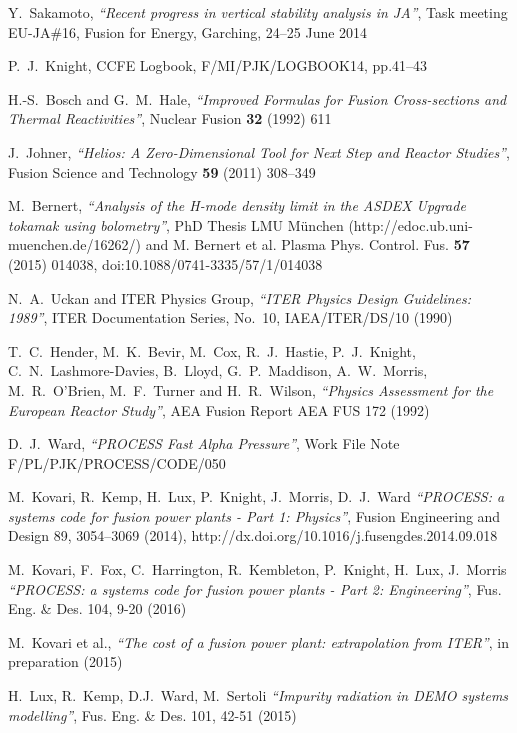 \documentclass[11pt,a4paper]{report}
\begin{document}
\begin{thebibliography}{99}
Y.\ Sakamoto,
\textit{``Recent progress in vertical stability analysis in JA''},
Task meeting EU-JA\#16, Fusion for Energy, Garching, 24--25 June 2014

P.\ J.\ Knight, CCFE Logbook, F/MI/PJK/LOGBOOK14, pp.41--43

H.-S.\ Bosch and G.\ M.\ Hale,
\textit{``Improved Formulas for Fusion Cross-sections and Thermal Reactivities''},
Nuclear Fusion \textbf{32} (1992) 611

J.\ Johner,
\textit{``Helios: A Zero-Dimensional Tool for Next Step and Reactor Studies''},
Fusion Science and Technology \textbf{59} (2011) 308--349

M.\ Bernert,
\textit{``Analysis of the H-mode density limit in the ASDEX Upgrade tokamak using bolometry''},
PhD Thesis LMU München (http://edoc.ub.uni-muenchen.de/16262/) and M. Bernert et al. Plasma Phys. Control. Fus. \textbf{57} (2015) 014038, doi:10.1088/0741-3335/57/1/014038

N.\ A.\ Uckan and ITER Physics Group,
\textit{``ITER Physics Design Guidelines: 1989''},
ITER Documentation Series, No.\ 10, IAEA/ITER/DS/10
(1990)

T.\ C.\ Hender, M.\ K.\ Bevir, M.\ Cox, R.\ J.\ Hastie, P.\ J.\
Knight, C.\ N.\ Lashmore-Davies, B.\ Lloyd, G.\ P.\ Maddison, A.\ W.\
Morris, M.\ R.\ O'Brien, M.\ F.\ Turner and H.\ R.\ Wilson,
\textit{``Physics Assessment for the European Reactor Study''},
AEA Fusion Report AEA FUS 172
(1992)

D.\ J.\ Ward,
\textit{``PROCESS Fast Alpha Pressure''},
Work File Note F/PL/PJK/PROCESS/CODE/050

M.\ Kovari, R.\ Kemp, H.\ Lux, P.\ Knight, J.\ Morris, D.\ J.\ Ward
\textit{``PROCESS: a systems code for fusion power plants - Part 1: Physics''},
Fusion Engineering and Design 89, 3054–3069 (2014), 
http://dx.doi.org/10.1016/j.fusengdes.2014.09.018

M.~Kovari, F.~Fox, C.~Harrington, R.~Kembleton, P.~Knight, H.~Lux, J.~Morris
\textit{``PROCESS: a systems code for fusion power plants - Part 2: Engineering''}, Fus. Eng. \& Des. 104, 9-20 (2016)


M.\ Kovari et al.,
\textit{``The cost of a fusion power plant: extrapolation from ITER''},
in preparation (2015)

H.~Lux, R.~Kemp, D.J.~Ward, M.~Sertoli
\textit{``Impurity radiation in DEMO systems modelling''},
Fus. Eng. \& Des. 101, 42-51 (2015)


\end{thebibliography}
\end{document}
